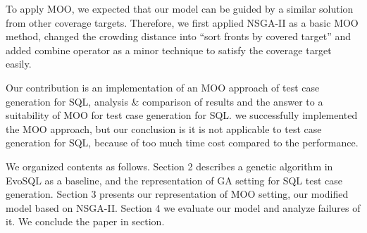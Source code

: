To apply MOO, we expected that our model can be guided by a similar solution from other coverage targets. Therefore, we first applied NSGA-II\cite{deb2002fast} as a basic MOO method, changed the crowding distance into ``sort fronts by covered target'' and added combine operator as a minor technique to satisfy the coverage target easily.
 

Our contribution is an implementation of an MOO approach of test case generation for SQL, analysis \& comparison of results and the answer to a suitability of MOO for test case generation for SQL. we successfully implemented the MOO approach, but our conclusion is it is not applicable to test case generation for SQL, because of too much time cost compared to the performance.

 
We organized contents as follows. Section 2 describes a genetic algorithm in EvoSQL as a baseline, and the representation of GA setting for SQL test case generation. Section 3 presents our representation of MOO setting, our modified model based on NSGA-II. Section 4 we evaluate our model and analyze failures of it. We conclude the paper in section.
